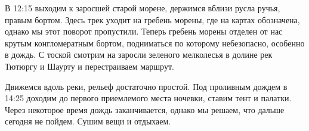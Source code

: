 В 12:15  выходим к заросшей старой морене, держимся вблизи русла ручья, правым бортом. Здесь трек уходит на гребень морены, где на картах обозначена, однако мы этот поворот пропустили. Теперь гребень морены отделен от нас крутым конгломератным бортом, подниматься по которому небезопасно, особенно в дождь. С тоской смотрим на заросли зеленого мелколесья в долине рек Тютюргу и Шаурту и перестраиваем маршрут.

Движемся вдоль реки, рельеф достаточно простой. Под проливным дождем в 14:25 доходим до первого приемлемого места ночевки, ставим тент и палатки. Через некоторое время дождь заканчивается, однако мы решаем, что дальше сегодня не пойдем. Сушим вещи и отдыхаем.












    \FloatBarrier
